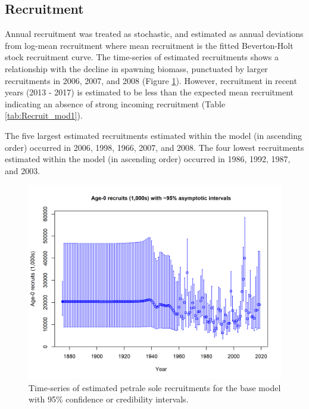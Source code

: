 \documentclass[12pt,]{article}
\begin{document}
\FloatBarrier

\subsection*{Recruitment}\label{recruitment}

Annual recruitment was treated as stochastic, and estimated as annual
deviations from log-mean recruitment where mean recruitment is the
fitted Beverton-Holt stock recruitment curve. The time-series of
estimated recruitments shows a relationship with the decline in spawning
biomass, punctuated by larger recruitments in 2006, 2007, and 2008
(Figure \ref{fig:Recruits_all}). However, recruitment in recent years
(2013 - 2017) is estimated to be less than the expected mean recruitment
indicating an absence of strong incoming recruitment (Table
\ref{tab:Recruit_mod1}).

The five largest estimated recruitments estimated within the model (in
ascending order) occurred in 2006, 1998, 1966, 2007, and 2008. The four
lowest recruitments estimated within the model (in ascending order)
occurred in 1986, 1992, 1987, and 2003.

\begin{figure}
\centering
\includegraphics{r4ss/plots_mod1/ts11_Age-0_recruits_(1000s)_with_95_asymptotic_intervals.png}
\caption{Time-series of estimated petrale sole recruitments for the base
model with 95\% confidence or credibility intervals.
\label{fig:Recruits_all}}
\end{figure}
\end{document}
